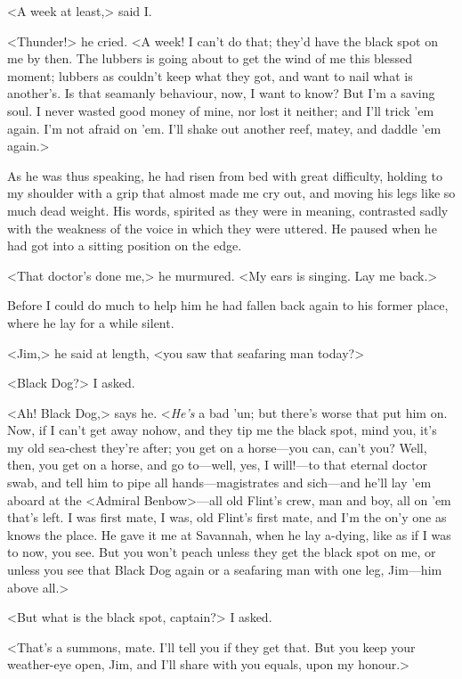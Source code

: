 <A week at least,> said I\@.

<Thunder!> he cried. <A week! I can't do that; they'd have the black spot on me by then. The lubbers is going about to get the wind of me this blessed moment; lubbers as couldn't keep what they got, and want to nail what is another's. Is that seamanly behaviour, now, I want to know? But I'm a saving soul. I never wasted good money of mine, nor lost it neither; and I'll trick 'em again. I'm not afraid on 'em. I'll shake out another reef, matey, and daddle 'em again.>

As he was thus speaking, he had risen from bed with great difficulty, holding to my shoulder with a grip that almost made me cry out, and moving his legs like so much dead weight. His words, spirited as they were in meaning, contrasted sadly with the weakness of the voice in which they were uttered. He paused when he had got into a sitting position on the edge.

<That doctor's done me,> he murmured. <My ears is singing. Lay me back.>

Before I could do much to help him he had fallen back again to his former place, where he lay for a while silent.

<Jim,> he said at length, <you saw that seafaring man today?>

<Black Dog?> I asked.

<Ah! Black Dog,> says he. <\textit{He's} a bad 'un; but there's worse that put him on. Now, if I can't get away nohow, and they tip me the black spot, mind you, it's my old sea-chest they're after; you get on a horse—you can, can't you? Well, then, you get on a horse, and go to—well, yes, I will!—to that eternal doctor swab, and tell him to pipe all hands—magistrates and sich—and he'll lay 'em aboard at the <Admiral Benbow>—all old Flint's crew, man and boy, all on 'em that's left. I was first mate, I was, old Flint's first mate, and I'm the on'y one as knows the place. He gave it me at Savannah, when he lay a-dying, like as if I was to now, you see. But you won't peach unless they get the black spot on me, or unless you see that Black Dog again or a seafaring man with one leg, Jim—him above all.>

<But what is the black spot, captain?> I asked.

<That's a summons, mate. I'll tell you if they get that. But you keep your weather-eye open, Jim, and I'll share with you equals, upon my honour.>

